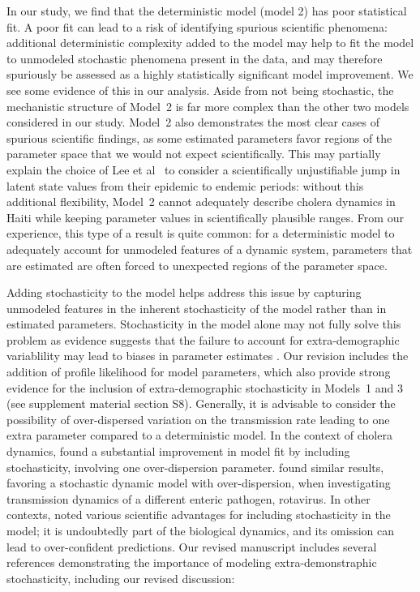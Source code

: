 \documentclass[11pt]{article}
\begin{document}
In our study, we find that the deterministic model (model 2) has poor statistical fit.
A poor fit can lead to a risk of identifying spurious scientific phenomena: additional deterministic complexity added to the model may help to fit the model to unmodeled stochastic phenomena present in the data, and may therefore spuriously be assessed as a highly statistically significant model improvement.
We see some evidence of this in our analysis.
Aside from not being stochastic, the mechanistic structure of Model~2 is far more complex than the other two models considered in our study.
Model~2 also demonstrates the most clear cases of spurious scientific findings, as some estimated parameters favor regions of the parameter space that we would not expect scientifically.
This may partially explain the choice of Lee et al~\cite{lee20} to consider a scientifically unjustifiable jump in latent state values from their epidemic to endemic periods: without this additional flexibility, Model~2 cannot adequately describe cholera dynamics in Haiti while keeping parameter values in scientifically plausible ranges.
From our experience, this type of a result is quite common: for a deterministic model to adequately account for unmodeled features of a dynamic system, parameters that are estimated are often forced to unexpected regions of the parameter space.

Adding stochasticity to the model helps address this issue by capturing unmodeled features in the inherent stochasticity of the model rather than in estimated parameters.
Stochasticity in the model alone may not fully solve this problem as evidence suggests that the failure to account for extra-demographic variablility may lead to biases in parameter estimates \cite{he10}.
Our revision includes the addition of profile likelihood for model parameters, which also provide strong evidence for the inclusion of extra-demographic stochasticity in Models~1 and 3 (see supplement material section S8).
Generally, it is advisable to consider the possibility of over-dispersed variation on the transmission rate \cite{breto09,he10} leading to one extra parameter compared to a deterministic model.
In the context of cholera dynamics, \cite{lemaitre19} found a substantial improvement in model fit by including stochasticity, involving one over-dispersion parameter.
\cite{stocks20} found similar results, favoring a stochastic dynamic model with over-dispersion, when investigating transmission dynamics of a different enteric pathogen, rotavirus.
In other contexts, \cite{king15} noted various scientific advantages for including stochasticity in the model; it is undoubtedly part of the biological dynamics, and its omission can lead to over-confident predictions.
Our revised manuscript includes several references demonstrating the importance of modeling extra-demonstraphic stochasticity, including our revised discussion: 
\end{document}
